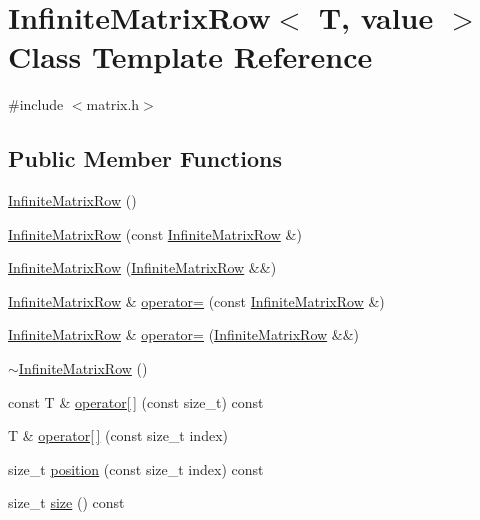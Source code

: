 \hypertarget{classInfiniteMatrixRow}{}\section{Infinite\+Matrix\+Row$<$ T, value $>$ Class Template Reference}
\label{classInfiniteMatrixRow}


{\ttfamily \#include $<$matrix.\+h$>$}

\subsection*{Public Member Functions}
\begin{DoxyCompactItemize}
\item 
\hyperlink{classInfiniteMatrixRow_a495dec4a3e90a4fd1fe3d7825e43abba}{Infinite\+Matrix\+Row} ()
\item 
\hyperlink{classInfiniteMatrixRow_a7422ebc877f93c773ef31fb719a68c7f}{Infinite\+Matrix\+Row} (const \hyperlink{classInfiniteMatrixRow}{Infinite\+Matrix\+Row} \&)
\item 
\hyperlink{classInfiniteMatrixRow_a19d9457c12f3fc43b0f0ef3b0974ad67}{Infinite\+Matrix\+Row} (\hyperlink{classInfiniteMatrixRow}{Infinite\+Matrix\+Row} \&\&)
\item 
\hyperlink{classInfiniteMatrixRow}{Infinite\+Matrix\+Row} \& \hyperlink{classInfiniteMatrixRow_a85345b8626b4db0a3b710642b7be490c}{operator=} (const \hyperlink{classInfiniteMatrixRow}{Infinite\+Matrix\+Row} \&)
\item 
\hyperlink{classInfiniteMatrixRow}{Infinite\+Matrix\+Row} \& \hyperlink{classInfiniteMatrixRow_a538c83787e8fdee733ca16971c84cb3b}{operator=} (\hyperlink{classInfiniteMatrixRow}{Infinite\+Matrix\+Row} \&\&)
\item 
\hyperlink{classInfiniteMatrixRow_a6712e49a239830fba7e90d8a2eedcd7b}{$\sim$\+Infinite\+Matrix\+Row} ()
\item 
const T \& \hyperlink{classInfiniteMatrixRow_a1cdb114c230a81dc8108f8973d13d89b}{operator\mbox{[}$\,$\mbox{]}} (const size\+\_\+t) const 
\item 
T \& \hyperlink{classInfiniteMatrixRow_a23bb33f8327b65d615edb777c9a3330e}{operator\mbox{[}$\,$\mbox{]}} (const size\+\_\+t index)
\item 
size\+\_\+t \hyperlink{classInfiniteMatrixRow_aa97620fe99f68244f55a7dd28b3d2b9d}{position} (const size\+\_\+t index) const 
\item 
size\+\_\+t \hyperlink{classInfiniteMatrixRow_a0055f3c386e84505c075860c0b6c7fba}{size} () const 
\end{DoxyCompactItemize}


